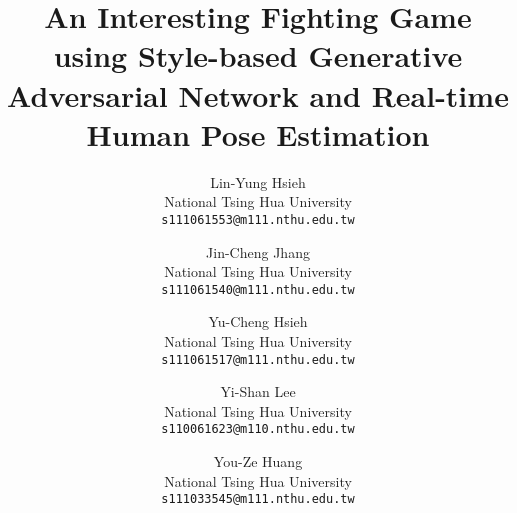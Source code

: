 \documentclass[10pt,twocolumn,letterpaper]{article}
\begin{document}
\title{An Interesting Fighting Game using Style-based Generative Adversarial Network and Real-time Human Pose Estimation}

\author{Lin-Yung Hsieh\\
National Tsing Hua University\\
{\tt\small s111061553@m111.nthu.edu.tw}
\and
Jin-Cheng Jhang\\
National Tsing Hua University\\
{\tt\small s111061540@m111.nthu.edu.tw}
\and
Yu-Cheng Hsieh\\
National Tsing Hua University\\
{\tt\small s111061517@m111.nthu.edu.tw}
\and
Yi-Shan Lee\\
National Tsing Hua University\\
{\tt\small s110061623@m110.nthu.edu.tw}
\and
You-Ze Huang\\
National Tsing Hua University\\
{\tt\small s111033545@m111.nthu.edu.tw}
}

\maketitle











% 
% 
{\small


}
\end{document}
